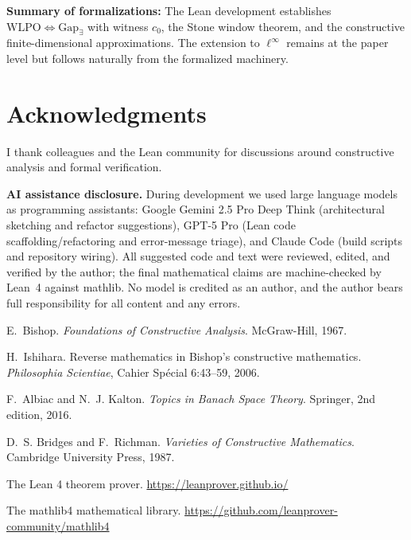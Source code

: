 \documentclass[11pt]{article}  %
\newcommand{\WLPO}{\mathrm{WLPO}}
\begin{document}
\noindent\textbf{Summary of formalizations:} The Lean development establishes $\WLPO \Leftrightarrow \text{Gap}_\exists$ with witness $c_0$, the Stone window theorem, and the constructive finite-dimensional approximations. The extension to $\ell^\infty$ remains at the paper level but follows naturally from the formalized machinery.

\section*{Acknowledgments}

I thank colleagues and the Lean community for discussions around constructive analysis and formal verification.

\smallskip
\noindent\textbf{AI assistance disclosure.} During development we used large language models as programming assistants: Google Gemini 2.5 Pro Deep Think (architectural sketching and refactor suggestions), GPT-5 Pro (Lean code scaffolding/refactoring and error-message triage), and Claude Code (build scripts and repository wiring). All suggested code and text were reviewed, edited, and verified by the author; the final mathematical claims are machine-checked by Lean~4 against mathlib. No model is credited as an author, and the author bears full responsibility for all content and any errors.


\begin{thebibliography}{10}

E.~Bishop.
\newblock \emph{Foundations of Constructive Analysis}.
\newblock McGraw-Hill, 1967.

H.~Ishihara.
\newblock Reverse mathematics in Bishop's constructive mathematics.
\newblock \emph{Philosophia Scientiae}, Cahier Sp\'ecial 6:43--59, 2006.

F.~Albiac and N.~J. Kalton.
\newblock \emph{Topics in Banach Space Theory}.
\newblock Springer, 2nd edition, 2016.

D.~S. Bridges and F.~Richman.
\newblock \emph{Varieties of Constructive Mathematics}.
\newblock Cambridge University Press, 1987.

The Lean 4 theorem prover.
\newblock \url{https://leanprover.github.io/}

The mathlib4 mathematical library.
\newblock \url{https://github.com/leanprover-community/mathlib4}

\end{thebibliography}
\end{document}
